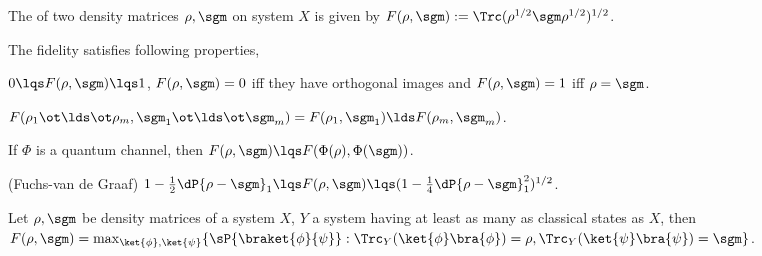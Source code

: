 \documentclass[article, a4paper, twoside]{universal}
\begin{document}
\begin{dfn}
    The  of two density matrices $\rho,\sgm$ on system $X$ is given by $F(\rho,\sgm):=\Trc(\rho^{1/2}\sgm\rho^{1/2})^{1/2}$.
\end{dfn}

\begin{thm}
    The fidelity satisfies following properties,
    \begin{itm}
        \item $0\lqs F(\rho,\sgm)\lqs 1$, $F(\rho,\sgm)=0$ iff they have orthogonal images and $F(\rho,\sgm)=1$ iff $\rho=\sgm$.
        \item $F(\rho_{1}\ot\lds\ot\rho_{m},\sgm_{1}\ot\lds\ot\sgm_{m})=F(\rho_{1},\sgm_{1})\lds F(\rho_{m},\sgm_{m})$.
        \item If $\Phi$ is a quantum channel, then $F(\rho,\sgm)\lqs F(\Phi(\rho),\Phi(\sgm))$.
        \item (Fuchs-van de Graaf) $1-\frac{1}{2}\dP{\rho-\sgm}_{1}\lqs F(\rho,\sgm)\lqs (1-\frac{1}{4}\dP{\rho-\sgm}_{1}^{2})^{1/2}$.
    \end{itm}

\end{thm}

\begin{thm}[Uhlmann]
    Let $\rho,\sgm$ be density matrices of a system $X$, $Y$ a system having at least as many as classical states as $X$, then $F(\rho,\sgm)=\max_{\ket{\phi},\ket{\psi}}\{\sP{\braket{\phi}{\psi}}:\Trc_{Y}(\ket{\phi}\bra{\phi})=\rho,\Trc_{Y}(\ket{\psi}\bra{\psi})=\sgm\}$.
\end{thm}
\end{document}
